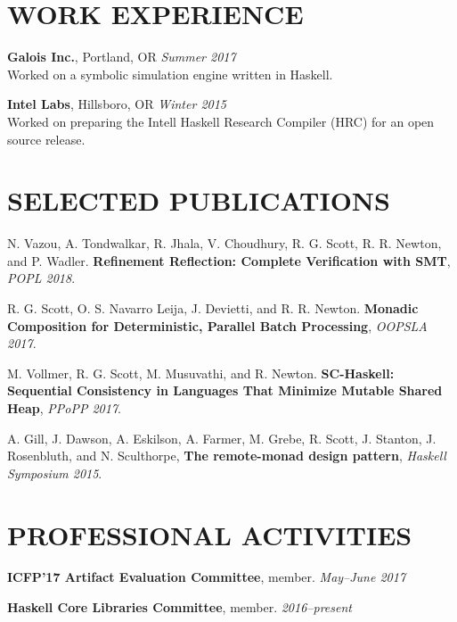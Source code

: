\documentclass{res}
\begin{document}
\begin{resume}

\section{WORK EXPERIENCE}
    \textbf{Galois Inc.}, Portland, OR \hfill \textit{Summer 2017} \\
    Worked on a symbolic simulation engine written in Haskell.

    \textbf{Intel Labs}, Hillsboro, OR \hfill \textit{Winter 2015} \\
    Worked on preparing the Intell Haskell Research Compiler (HRC) for an open source release.

\section{SELECTED PUBLICATIONS}
        N. Vazou, A. Tondwalkar, R. Jhala, V. Choudhury, R. G. Scott, R. R. Newton, and P. Wadler. \textbf{Refinement Reflection: Complete Verification with SMT}, \textit{POPL 2018}.

        R. G. Scott, O. S. Navarro Leija, J. Devietti, and R. R. Newton. \textbf{Monadic Composition for Deterministic, Parallel Batch Processing}, \textit{OOPSLA 2017}.

        M. Vollmer, R. G. Scott, M. Musuvathi, and R. Newton. \textbf{SC-Haskell: Sequential Consistency in Languages That Minimize Mutable Shared Heap}, \textit{PPoPP 2017}.

        A. Gill, J. Dawson, A. Eskilson, A. Farmer, M. Grebe, R. Scott, J. Stanton, J. Rosenbluth, and N. Sculthorpe, \textbf{The remote-monad design pattern}, \textit{Haskell Symposium 2015}.

\section{PROFESSIONAL ACTIVITIES}
    \textbf{ICFP'17 Artifact Evaluation Committee}, member. \hfill \textit{May--June 2017}

    \textbf{Haskell Core Libraries Committee}, member. \hfill \textit{2016--present}


\end{resume}
\end{document}
